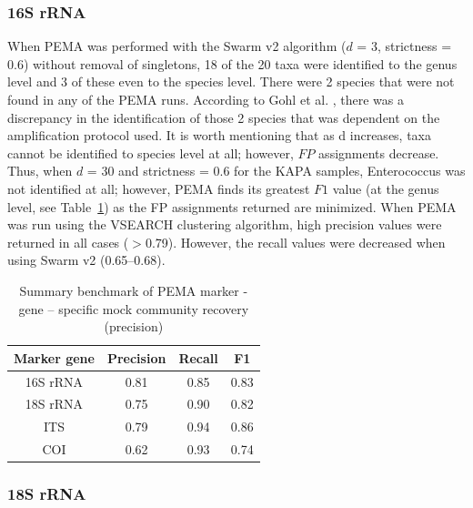    \subsubsection*{16S rRNA}

   When PEMA was performed with the Swarm v2 algorithm ($d$ = 3, strictness = 0.6) without removal of singletons, 18 of the 20 taxa were identified to the genus level and 3 of these even to the species level. 
   There were 2 species that were not found in any of the PEMA runs. 
   According to Gohl et al. \citep{gohl2016systematic}, there was a discrepancy in the identification of those 2 species that was dependent on the amplification protocol used. 
   It is worth mentioning that as d increases, taxa cannot be identified to species level at all; 
   however, $FP$ assignments decrease. 
   Thus, when $d$ = 30 and strictness = 0.6 for the KAPA samples, Enterococcus was not identified at all; 
   however, PEMA finds its greatest $F1$ value (at the genus level, see Table~\ref{table:pema-precision}) as the FP assignments returned are minimized. 
   When PEMA was run using the VSEARCH clustering algorithm, high precision values were returned in all cases ($>$0.79). 
   However, the recall values were decreased when using Swarm v2 (0.65–0.68).

   \begin{table}
      \begin{center}
         \begin{tabular}{@{}cccc@{}}
            \toprule
            \multicolumn{1}{c}{\textbf{Marker gene}} & \multicolumn{1}{c}{\textbf{Precision}} & \multicolumn{1}{c}{\textbf{Recall}} & \multicolumn{1}{c}{\textbf{F1}} \\ \midrule
            16S rRNA & 0.81 & 0.85 & 0.83 \\
            18S rRNA & 0.75 & 0.90 & 0.82 \\
            ITS & 0.79 & 0.94 & 0.86 \\
            COI & 0.62 & 0.93 & 0.74
            \end{tabular}
            \caption[Summary benchmark of PEMA marker - gene - specific mock community recovery]{Summary benchmark of PEMA marker - gene – specific mock community recovery (precision)}
            \label{table:pema-precision}
      \end{center}
    \end{table}




   \subsubsection*{18S rRNA}

